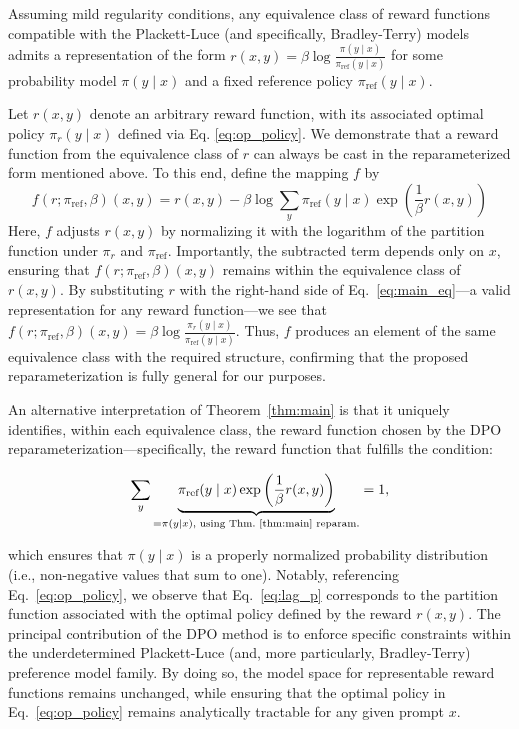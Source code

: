\begin{theorem}\label{thm:main}
    Assuming mild regularity conditions, any equivalence class of reward functions compatible with the Plackett-Luce (and specifically, Bradley-Terry) models admits a representation of the form ${r(x, y) = \beta \log \frac{\pi(y\mid x)}{\pi_\text{ref}(y\mid x)}}$ for some probability model $\pi(y\mid x)$ and a fixed reference policy $\pi_\text{ref}(y \mid x)$.
\end{theorem}

\begin{sproof}
    Let $r(x, y)$ denote an arbitrary reward function, with its associated optimal policy $\pi_r(y \mid x)$ defined via Eq. \ref{eq:op_policy}. We demonstrate that a reward function from the equivalence class of $r$ can always be cast in the reparameterized form mentioned above. To this end, define the mapping $f$ by
\begin{equation}
    f(r; \pi_\text{ref}, \beta)(x, y) = r(x, y) - \beta\log\sum_{y}\pi_\text{ref}(y\mid x)\exp\left(\frac{1}{\beta}r(x, y)\right)
\end{equation}
Here, $f$ adjusts $r(x, y)$ by normalizing it with the logarithm of the partition function under $\pi_r$ and $\pi_\text{ref}$. Importantly, the subtracted term depends only on $x$, ensuring that $f(r; \pi_\text{ref}, \beta)(x, y)$ remains within the equivalence class of $r(x, y)$. By substituting $r$ with the right-hand side of Eq.~\ref{eq:main_eq}—a valid representation for any reward function—we see that $f(r; \pi_\text{ref}, \beta)(x, y) = \beta \log \frac{\pi_r(y\mid x)}{\pi_\text{ref}(y\mid x)}$. Thus, $f$ produces an element of the same equivalence class with the required structure, confirming that the proposed reparameterization is fully general for our purposes.
\end{sproof}

An alternative interpretation of Theorem~\ref{thm:main} is that it uniquely identifies, within each equivalence class, the reward function chosen by the DPO reparameterization—specifically, the reward function that fulfills the condition:

\begin{equation}\label{eq:lag_p}
     \sum_{y}\underbrace{\pi_\text{ref}(y\mid x)\exp\left(\frac{1}{\beta}r(x, y)\right)}_{=\pi(y\mid x)\text{, using Thm.~\ref{thm:main} reparam.}} = 1,
\end{equation}

which ensures that $\pi(y\mid x)$ is a properly normalized probability distribution (i.e., non-negative values that sum to one). Notably, referencing Eq.~\ref{eq:op_policy}, we observe that Eq.~\ref{eq:lag_p} corresponds to the partition function associated with the optimal policy defined by the reward $r(x, y)$. The principal contribution of the DPO method is to enforce specific constraints within the underdetermined Plackett-Luce (and, more particularly, Bradley-Terry) preference model family. By doing so, the model space for representable reward functions remains unchanged, while ensuring that the optimal policy in Eq.~\ref{eq:op_policy} remains analytically tractable for any given prompt $x$.

